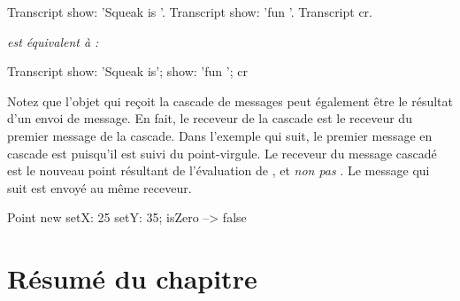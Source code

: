 \documentclass[a4paper,10pt,twoside]{book}
\begin{document}

\begin{minipage}{0.3\textwidth}
\begin{code}{}
Transcript show: 'Squeak is '.
Transcript show: 'fun '.
Transcript cr.
\end{code}
\end{minipage}
\emph{est \'equivalent \`a :}
\begin{minipage}{0.3\textwidth}
\begin{code}{}
Transcript        
   show: 'Squeak is';
   show: 'fun ';
   cr
\end{code}
\end{minipage}

Notez que l'objet qui re\c{c}oit la cascade de messages peut \'egalement \^etre le r\'esultat d'un envoi de message.
En fait, le receveur de la cascade est le receveur du premier message de la cascade. Dans l'exemple qui suit, le premier message en cascade est  puisqu'il est suivi du point-virgule. Le receveur du message cascad\'e  est le nouveau point r\'esultant de l'\'evaluation de , et \emph{non pas} . Le message qui suit  est envoy\'e au m\^eme receveur. 

\begin{code}{}
Point new setX: 25 setY: 35; isZero --> false
\end{code}

\section{R\'esum\'e du chapitre}
\end{document}
